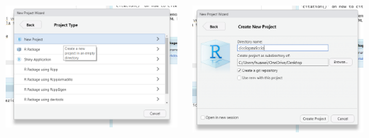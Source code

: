 \documentclass[
  ignorenonframetext,
]{beamer}
\begin{document}
\begin{frame}{}
\protect\hypertarget{section-2}{}
\begin{columns}[T]
\begin{column}{0.48\textwidth}
\begin{center}\includegraphics[width=1\linewidth]{img/project2} \end{center}
\end{column}

\begin{column}{0.48\textwidth}
\begin{center}\includegraphics[width=1\linewidth]{img/project3} \end{center}
\end{column}
\end{columns}
\end{frame}
\end{document}
